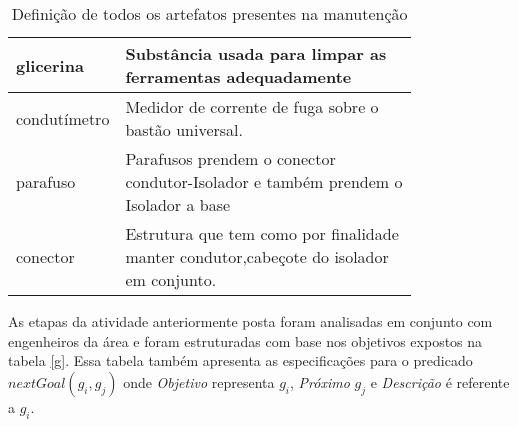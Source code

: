 \begin{table}[H]
\begin{tabular}{|l|p{0.8\linewidth}|}
glicerina & Substância usada para limpar as ferramentas adequadamente \\ \hline
condutímetro & Medidor de corrente de fuga sobre o bastão universal. \\ \hline
parafuso & Parafusos prendem o conector condutor-Isolador e também prendem o Isolador a base \\ \hline
conector & Estrutura que tem como por finalidade manter condutor,cabeçote do isolador em conjunto. \\ \hline
\end{tabular}
\caption{Definição de todos os artefatos presentes na manutenção}
\label{artefacts}
\end{table} 

As etapas da atividade anteriormente posta foram analisadas em conjunto com engenheiros da área e foram estruturadas com base nos objetivos expostos na tabela \ref{g}. Essa tabela também apresenta as especificações para o predicado $nextGoal(g_i,g_j)$ onde \textit{Objetivo} representa $g_i$, \textit{Próximo} $g_j$ e \textit{Descrição} é referente a $g_i$.

